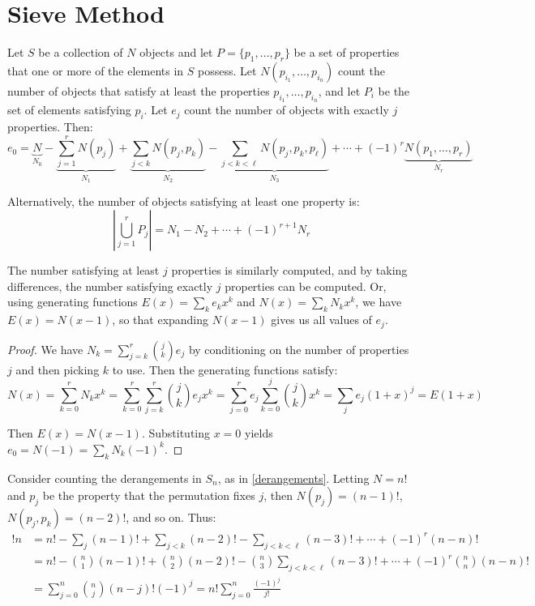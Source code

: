 \documentclass[a4paper]{article}
\begin{document}
\section{Sieve Method}
\begin{theorem}
Let $S$ be a collection of $N$ objects and let $P=\{p_1,\dots,p_r\}$ be a set of properties that one or more of the elements in $S$ possess. Let $N(p_{i_1},\dots,p_{i_n})$ count the number of objects that satisfy at least the properties $p_{i_1},\dots,p_{i_n}$, and let $P_i$ be the set of elements satisfying $p_i$. Let $e_j$ count the number of objects with exactly $j$ properties. Then:
\begin{equation*}
e_0
=\underbrace{N}_{N_0}-\underbrace{\sum_{j=1}^rN(p_j)}_{N_1}+\underbrace{\sum_{j<k}N(p_j,p_k)}_{N_2}-\underbrace{\sum_{j<k<\ell}N(p_j,p_k,p_\ell)}_{N_3}+\cdots+(-1)^r\underbrace{N(p_1,\dots,p_r)}_{N_r}
\end{equation*}

Alternatively, the number of objects satisfying at least one property is:
\begin{equation*}
\left|\bigcup_{j=1}^rP_j\right|
=N_1-N_2+\cdots+(-1)^{r+1}N_r
\end{equation*}

The number satisfying at least $j$ properties is similarly computed, and by taking differences, the number satisfying exactly $j$ properties can be computed. Or, using generating functions $E(x)=\sum_ke_kx^k$ and $N(x)=\sum_kN_kx^k$, we have $E(x)=N(x-1)$, so that expanding $N(x-1)$ gives us all values of $e_j$.
\begin{hl}
\begin{proof}
We have $N_k=\sum_{j=k}^r\binom jke_j$ by conditioning on the number of properties $j$ and then picking $k$ to use. Then the generating functions satisfy:
\begin{equation*}
N(x)
=\sum_{k=0}^rN_kx^k
=\sum_{k=0}^r\sum_{j=k}^r\binom jke_jx^k
=\sum_{j=0}^re_j\sum_{k=0}^j\binom jkx^k
=\sum_je_j(1+x)^j
=E(1+x)
\end{equation*}

Then $E(x)=N(x-1)$. Substituting $x=0$ yields $e_0=N(-1)=\sum_kN_k(-1)^k$.
\end{proof}
\end{hl}
\end{theorem}

\begin{example}
Consider counting the derangements in $S_n$, as in \ref{derangements}. Letting $N=n!$ and $p_j$ be the property that the permutation fixes $j$, then $N(p_j)=(n-1)!$, $N(p_j,p_k)=(n-2)!$, and so on. Thus:
\begin{align*}
!n
&=n!-\sum_{j}(n-1)!+\sum_{j<k}(n-2)!-\sum_{j<k<\ell}(n-3)!+\cdots+(-1)^r(n-n)!\\
&=n!-\binom n1(n-1)!+\binom n2(n-2)!-\binom n3\sum_{j<k<\ell}(n-3)!+\cdots+(-1)^r\binom nn(n-n)!\\
&=\sum_{j=0}^n\binom nj(n-j)!(-1)^j
=n!\sum_{j=0}^n\frac{(-1)^j}{j!}
\end{align*}
\end{example}
\end{document}
